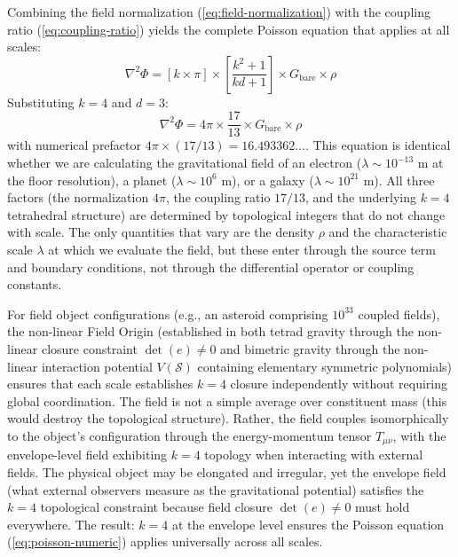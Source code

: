 \documentclass[aps,prd,preprint,superscriptaddress,showpacs,preprintnumbers,amsmath,amssymb,nofootinbib]{revtex4-2}
\begin{document}
Combining the field normalization (\ref{eq:field-normalization}) with the coupling ratio (\ref{eq:coupling-ratio}) yields the complete Poisson equation that applies at all scales:
\begin{equation}
\nabla^2\Phi = \left[k\times\pi\right] \times \left[\frac{k^2+1}{kd+1}\right] \times G_{\text{bare}} \times \rho
\label{eq:poisson-general}
\end{equation}
Substituting $k=4$ and $d=3$:
\begin{equation}
\nabla^2\Phi = 4\pi \times \frac{17}{13} \times G_{\text{bare}} \times \rho
\label{eq:poisson-numeric}
\end{equation}
with numerical prefactor $4\pi \times (17/13) = 16.493362\ldots$. This equation is identical whether we are calculating the gravitational field of an electron ($\lambda \sim 10^{-13}$ m at the floor resolution), a planet ($\lambda \sim 10^6$ m), or a galaxy ($\lambda \sim 10^{21}$ m). All three factors (the normalization $4\pi$, the coupling ratio $17/13$, and the underlying $k=4$ tetrahedral structure) are determined by topological integers that do not change with scale. The only quantities that vary are the density $\rho$ and the characteristic scale $\lambda$ at which we evaluate the field, but these enter through the source term and boundary conditions, not through the differential operator or coupling constants.

For field object configurations (e.g., an asteroid comprising $10^{33}$ coupled fields), the non-linear Field Origin (established in both tetrad gravity through the non-linear closure constraint $\det(e) \neq 0$ and bimetric gravity through the non-linear interaction potential $V(\mathcal{S})$ containing elementary symmetric polynomials) ensures that each scale establishes $k=4$ closure independently without requiring global coordination. The field is not a simple average over constituent mass (this would destroy the topological structure). Rather, the field couples isomorphically to the object's configuration through the energy-momentum tensor $T_{\mu\nu}$, with the envelope-level field exhibiting $k=4$ topology when interacting with external fields. The physical object may be elongated and irregular, yet the envelope field (what external observers measure as the gravitational potential) satisfies the $k=4$ topological constraint because field closure $\det(e) \neq 0$ must hold everywhere. The result: $k=4$ at the envelope level ensures the Poisson equation (\ref{eq:poisson-numeric}) applies universally across all scales.
\end{document}
